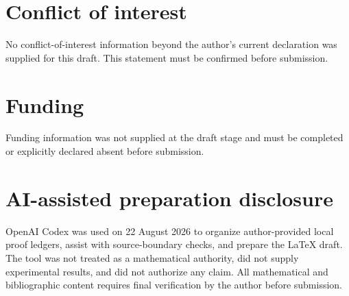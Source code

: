 \documentclass[11pt]{article}
\theoremstyle{definition}
\begin{document}
\section*{Conflict of interest}
No conflict-of-interest information beyond the author's current declaration
was supplied for this draft.  This statement must be confirmed before
submission.

\section*{Funding}
Funding information was not supplied at the draft stage and must be completed
or explicitly declared absent before submission.

\section*{AI-assisted preparation disclosure}
OpenAI Codex was used on 22 August 2026 to organize author-provided local proof
ledgers, assist with source-boundary checks, and prepare the LaTeX draft.  The
tool was not treated as a mathematical authority, did not supply experimental
results, and did not authorize any claim.  All mathematical and bibliographic
content requires final verification by the author before submission.

\begingroup
\small


\endgroup
\end{document}
